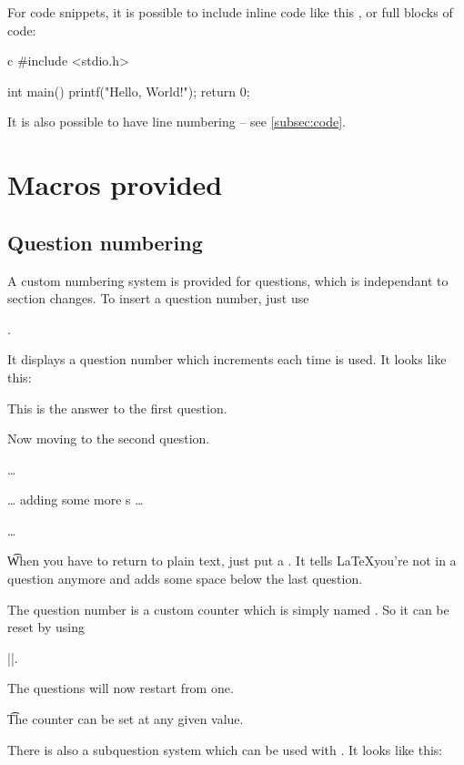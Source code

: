 \documentclass[a4paper, 11pt]{old-dms}
\begin{document}
For code snippets, it is possible to include inline code like this , or full blocks of code:
\begin{codeboxnonos}{c}
#include <stdio.h>

int main() {
   printf("Hello, World!");
   return 0;
}
\end{codeboxnonos}
It is also possible to have line numbering -- see \ref{subsec:code}.


\section{Macros provided}


\subsection{Question numbering}

A custom numbering system is provided for questions, which is independant to section changes. To insert a question number, just use

.

It displays a question number which increments each time  is used. It looks like this:

\q This is the answer to the first question.

\q Now moving to the second question.

\q \dots 

\q \dots{} adding some more  s \dots

\q \dots

\t

When you have to return to plain text, just put a . It tells \LaTeX you're not in a question anymore and adds  some space below the last question.

The question number is a custom counter which is simply named . So it can be reset by using

|\setcounter{question}{1}|.

\setcounter{question}{1}

\q The questions will now restart from one.

\t

The  counter can be set at any given value.

There is also a subquestion system which can be used with . It looks like this:
\end{document}
